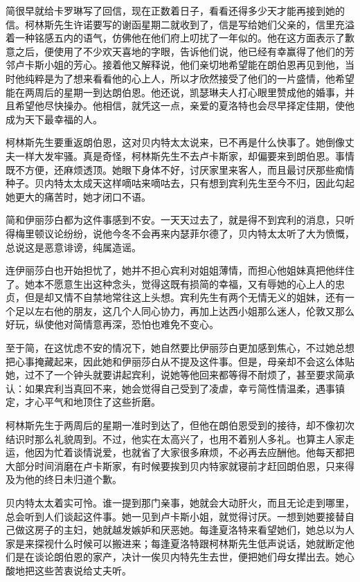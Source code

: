 \par 简很早就给卡罗琳写了回信，现在正数着日子，看看还得多少天才能再接到她的信。柯林斯先生许诺要写的谢函星期二就收到了，信是写给她们父亲的，信里充溢着一种铭感五内的语气，仿佛他在他们府上叨扰了一年似的。他在这方面表示了歉意之后，便使用了不少欢天喜地的字眼，告诉他们说，他已经有幸赢得了他们的芳邻卢卡斯小姐的芳心。接着他又解释说，他们亲切地希望能在朗伯恩再见到他，当时他纯粹是为了想来看看他的心上人，所以才欣然接受了他们的一片盛情，他希望能在两周后的星期一到达朗伯恩。他还说，凯瑟琳夫人打心眼里赞成他的婚事，并且希望他尽快操办。他相信，就凭这一点，亲爱的夏洛特也会尽早择定佳期，使他成为天下最幸福的人。
\par 柯林斯先生要重返朗伯恩，这对贝内特太太说来，已不再是什么快事了。她倒像丈夫一样大发牢骚。真是奇怪，柯林斯先生不去卢卡斯家，却偏要来到朗伯恩。事情既不方便，还麻烦透顶。她眼下身体不好，讨厌家里来客人，而且最讨厌那些痴情种子。贝内特太太成天这样嘀咕来嘀咕去，只有想到宾利先生至今不归，因此勾起她更大的痛苦时，她才闭口不语。
\par 简和伊丽莎白都为这件事感到不安。一天天过去了，就是得不到宾利的消息，只听得梅里顿议论纷纷，说他今冬不会再来内瑟菲尔德了，贝内特太太听了大为愤慨，总说这是恶意诽谤，纯属造谣。
\par 连伊丽莎白也开始担忧了，她并不担心宾利对姐姐薄情，而担心他姐妹真把他绊住了。她本不愿意生出这种念头，觉得这既有损简的幸福，又有辱她的心上人的忠贞，但是却又情不自禁地常往这上头想。宾利先生有两个无情无义的姐妹，还有一个足以左右他的朋友，这几个人同心协力，再加上达西小姐那么迷人，伦敦又那么好玩，纵使他对简情意再深，恐怕也难免不变心。
\par 至于简，在这忧虑不安的情况下，她自然要比伊丽莎白更加感到焦心，不过她总想把心事掩藏起来，因此她和伊丽莎白从不提及这件事。但是，母亲却不会这么体贴她，过不了一个钟头就要讲起宾利，说她等他回来都等得不耐烦了，甚至要求简承认：如果宾利当真回不来，她会觉得自己受到了凌虐，幸亏简性情温柔，遇事镇定，才心平气和地顶住了这些折磨。
\par 柯林斯先生于两周后的星期一准时到达了，但他在朗伯恩受到的接待，却不像初次结识时那么礼貌周到。不过，他实在太高兴了，也用不着别人多礼。也算主人家走运，他因为忙着谈情说爱，也就省了大家很多麻烦，不必再去应酬他。他每天都把大部分时间消磨在卢卡斯家，有时候要挨到贝内特家就寝前才赶回朗伯恩，只来得及为他的终日未归道个歉。
\par 贝内特太太着实可怜。谁一提到那门亲事，她就会大动肝火，而且无论走到哪里，总会听到人们谈起这件事。她一见到卢卡斯小姐，就觉得讨厌。一想到她要接替自己做这房子的主妇，她就越发嫉妒和厌恶她。每逢夏洛特来看望她们，她总以为人家是来探视什么时候可以搬进来；每逢夏洛特跟柯林斯先生低声说话，她就断定他们是在谈论朗伯恩的家产，决计一俟贝内特先生去世，便把她们母女撵出去。她心酸地把这些苦衷说给丈夫听。
